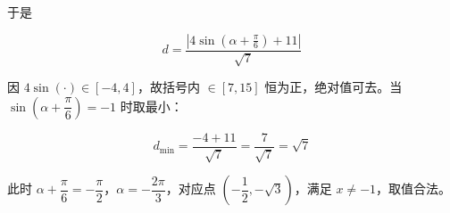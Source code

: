 \begin{answer}
于是

\nopagebreak[4]
\[d=\frac{\left|4\sin\left(\alpha+\frac\pi6\right)+11\right|}{\sqrt7}\]

因 $4\sin(\cdot)\in[-4,4]$，故括号内 $\in[7,15]$ 恒为正，绝对值可去。当 $\sin\left(\alpha+\dfrac\pi6\right)=-1$ 时取最小：

\nopagebreak[4]
\[d_{\min}=\frac{-4+11}{\sqrt7}=\frac7{\sqrt7}=\sqrt7\]

此时 $\alpha+\dfrac\pi6=-\dfrac\pi2$，$\alpha=-\dfrac{2\pi}3$，对应点 $\left(-\dfrac12,-\sqrt3\right)$，满足 $x\ne-1$，取值合法。



\par\medskip

\end{answer}
